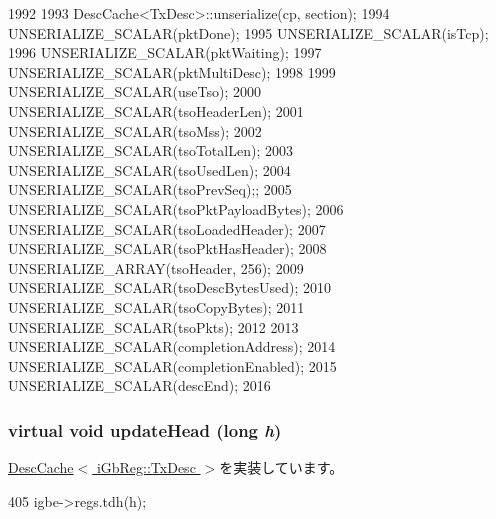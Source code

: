 \begin{DoxyCode}
1992 {
1993     DescCache<TxDesc>::unserialize(cp, section);
1994     UNSERIALIZE_SCALAR(pktDone);
1995     UNSERIALIZE_SCALAR(isTcp);
1996     UNSERIALIZE_SCALAR(pktWaiting);
1997     UNSERIALIZE_SCALAR(pktMultiDesc);
1998 
1999     UNSERIALIZE_SCALAR(useTso);
2000     UNSERIALIZE_SCALAR(tsoHeaderLen);
2001     UNSERIALIZE_SCALAR(tsoMss);
2002     UNSERIALIZE_SCALAR(tsoTotalLen);
2003     UNSERIALIZE_SCALAR(tsoUsedLen);
2004     UNSERIALIZE_SCALAR(tsoPrevSeq);;
2005     UNSERIALIZE_SCALAR(tsoPktPayloadBytes);
2006     UNSERIALIZE_SCALAR(tsoLoadedHeader);
2007     UNSERIALIZE_SCALAR(tsoPktHasHeader);
2008     UNSERIALIZE_ARRAY(tsoHeader, 256);
2009     UNSERIALIZE_SCALAR(tsoDescBytesUsed);
2010     UNSERIALIZE_SCALAR(tsoCopyBytes);
2011     UNSERIALIZE_SCALAR(tsoPkts);
2012 
2013     UNSERIALIZE_SCALAR(completionAddress);
2014     UNSERIALIZE_SCALAR(completionEnabled);
2015     UNSERIALIZE_SCALAR(descEnd);
2016 }
\end{DoxyCode}
\hypertarget{classIGbE_1_1TxDescCache_a4f8dbb4f64167626cac110753708c55c}{
\subsubsection[{updateHead}]{\setlength{\rightskip}{0pt plus 5cm}virtual void updateHead (long {\em h})}}
\label{classIGbE_1_1TxDescCache_a4f8dbb4f64167626cac110753708c55c}


\hyperlink{classIGbE_1_1DescCache_af48912789332a0283480cd85c7197f15}{DescCache$<$ iGbReg::TxDesc $>$}を実装しています。


\begin{DoxyCode}
405 { igbe->regs.tdh(h); }
\end{DoxyCode}


